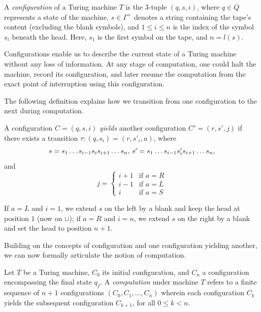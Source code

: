 \begin{definition}
A \emph{configuration} of a Turing machine $T$ is the 3-tuple $\left(q,s,i\right)$, where $q\in Q$ represents a state of the machine, $s\in\Gamma^+$ denotes a string containing the tape's content (excluding the blank symbols), and $1 \le i \le n$ is the index of the symbol $s_i$ beneath the head. Here, $s_1$ is the first symbol on the tape, and $n=l(s)$. 
\end{definition}

Configurations enable us to describe the current state of a Turing machine without any loss of information. At any stage of computation, one could halt the machine, record its configuration, and later resume the computation from the exact point of interruption using this configuration.

The following definition explains how we transition from one configuration to the next during computation.

\begin{definition}
A configuration $C=\left(q,s,i\right)$ \emph{yields} another configuration $C'=\left(r,s',j\right)$ if there exists a transition $\tau:\left(q, s_{i}\right) = \left(r, s'_{i}, a\right)$, where
\[
s=s_{1} \dots s_{i-1}s_{i}s_{i+1} \dots s_{n}$, $s'=s_{1} \dots s_{i-1}s'_{i}s_{i+1} \dots s_{n},
\]
and
\begin{equation}
  j = \begin{cases}
        i+1 & \text{if $a=R$} \\
        i-1 & \text{if $a=L$} \\
        i   & \text{if $a=S$}
  \end{cases}
\end{equation}
\end{definition}

If $a=L$ and $i=1$, we extend $s$ on the left by a blank and keep the head at position $1$ (now on $\sqcup$); if $a=R$ and $i=n$, we extend $s$ on the right by a blank and set the head to position $n+1$.

Building on the concepts of configuration and one configuration yielding another, we can now formally articulate the notion of computation.

\begin{definition}[Computation]
Let $T$ be a Turing machine, $C_{0}$ its initial configuration, and $C_n$ a configuration encompassing the final state $q_f$. A \emph{computation} under machine $T$ refers to a finite sequence of $n+1$ configurations $\left(C_{0},C_{1},\ldots,C_n\right)$ wherein each configuration $C_{k}$ yields the subsequent configuration $C_{k+1}$, for all $0\leq k < n$.
\end{definition}

